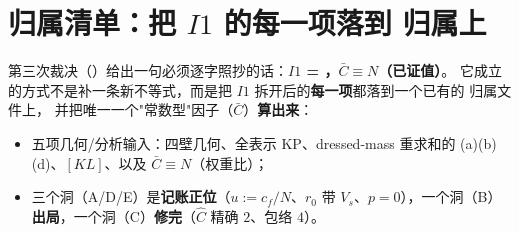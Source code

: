 \section{归属清单：把 $I1$ 的每一项落到 \LT{} 归属上}\label{sec:assembly}

第三次裁决（）给出一句必须逐字照抄的话：\textbf{$I1$ = \LT，$\bar C\equiv N$（已证值）}。
它成立的方式不是补一条新不等式，而是把 $I1$ 拆开后的\textbf{每一项}都落到一个已有的 \LT{} 归属文件上，
并把唯一一个"常数型"因子（$\bar C$）\textbf{算出来}：

\begin{itemize}
\item 五项几何/分析输入：四壁几何、全表示 KP、dressed-mass 重求和的 (a)(b)(d)、$[KL]$、以及 $\bar C\equiv N$（权重比）；
\item 三个洞（A/D/E）是\textbf{记账正位}（$u:=c_f/N$、$r_0$ 带 $V_s$、$p=0$），一个洞（B）\textbf{出局}，一个洞（C）\textbf{修完}（$\hat C$ 精确 $2$、包络 $4$）。
\end{itemize}


